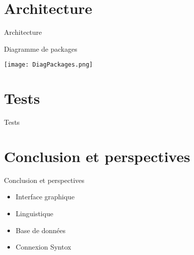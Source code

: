 \documentclass[11pt]{beamer}
\begin{document}
\section{Architecture}
\begin{frame}{Architecture}
\begin{block}{Diagramme de packages}
\begin{center}
\texttt{[image: DiagPackages.png]}
\end{center}
\end{block}
\end{frame}

\section{Tests}
\begin{frame}{Tests}



\begin{itemize}
\end{itemize}

\begin{itemize}
\end{itemize}
\end{frame}


\section{Conclusion et perspectives}
\begin{frame}{Conclusion et perspectives}
\begin{itemize}[<+->]
\item Interface graphique
\item Linguistique
\item Base de données
\item Connexion Syntox
\end{itemize}
\end{frame}
\end{document}
